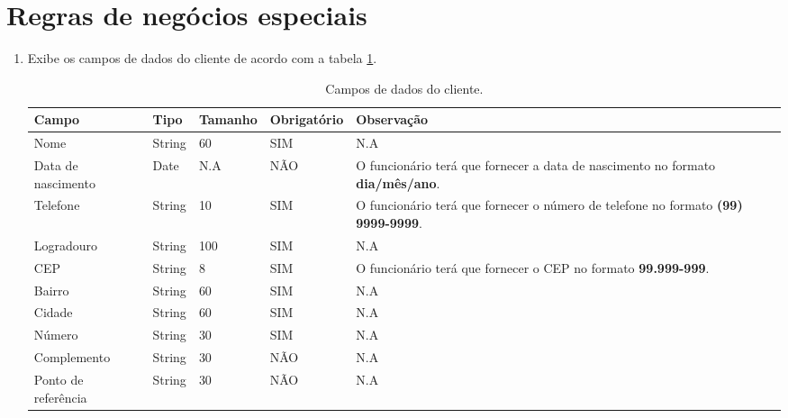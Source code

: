 \section{Regras de negócios especiais}

\begin{enumerate}[label=RN\arabic*]
	\item Exibe os campos de dados do cliente de acordo com a tabela \ref{uc001_tb_rn1}. \label{uc001_rn:1}
	\begin{table}[htb]
		\ABNTEXfontereduzida
		\caption[Campos de dados do cliente]{Campos de dados do cliente.}
		\label{uc001_tb_rn1}
		\begin{tabular}{|p{3.0cm}|p{2.0cm}|p{1.5cm}|p{2.0cm}|p{5.75cm}|}
			\hline
			\textbf{Campo}      & \textbf{Tipo} & \textbf{Tamanho} & \textbf{Obrigatório} & \textbf{Observação}                                                                      \\ \hline
			Nome                & String        & 60               & SIM                  & N.A                                                                                      \\ \hline
			Data de nascimento  & Date          & N.A              & NÃO                  & O funcionário terá que fornecer a data de nascimento no formato \textbf{dia/mês/ano}.    \\ \hline
			Telefone            & String        & 10               & SIM                  & O funcionário terá que fornecer o número de telefone no formato \textbf{(99) 9999-9999}. \\ \hline
			Logradouro          & String        & 100              & SIM                  & N.A                                                                                      \\ \hline
			CEP                 & String        & 8                & SIM                  & O funcionário terá que fornecer o CEP no formato \textbf{99.999-999}.                    \\ \hline
			Bairro              & String        & 60               & SIM                  & N.A                                                                                      \\ \hline
			Cidade              & String        & 60               & SIM                  & N.A                                                                                      \\ \hline
			Número              & String        & 30               & SIM                  & N.A                                                                                      \\ \hline
			Complemento         & String        & 30               & NÃO                  & N.A                                                                                      \\ \hline
			Ponto de referência & String        & 30               & NÃO                  & N.A                                                                                      \\ \hline
		\end{tabular}
	\end{table}
\end{enumerate}
